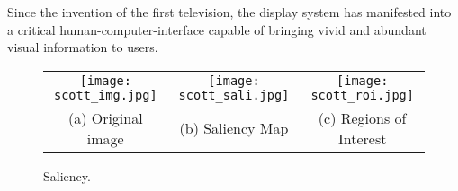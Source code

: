 Since the invention of the first television, the display system has manifested into a critical human-computer-interface 
capable of bringing vivid and abundant visual information to users. 

\begin{figure*}[!htb]
\centering
\begin{tabular}{@{}c@{} @{}c@{} @{}c@{}}
\vspace{-15pt}
\texttt{[image: scott\_img.jpg]} & \texttt{[image: scott\_sali.jpg]} & \texttt{[image: scott\_roi.jpg]}\\[\abovecaptionskip]
\small(a) Original image & \small (b) Saliency Map & \small (c) Regions of Interest \\
\end{tabular}
\caption{Saliency.}
\label{tab:saliency}
\end{figure*}
